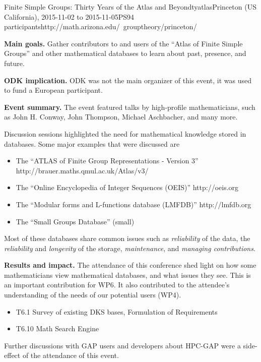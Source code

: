 \begin{event}{Finite Simple Groups: Thirty Years of the Atlas and
    Beyond}{tyatlas}{Princeton (US California), 2015-11-02 to 2015-11-05}{PS}{94
    participants}{http://math.arizona.edu/~grouptheory/princeton/}

\textbf{Main goals.} Gather contributors to and users of the ``Atlas of Finite
Simple Groups'' and other mathematical databases to learn about past, presence,
and future.

\textbf{ODK implication.} ODK was not the main organizer of this event, it was used to fund
a European participant.

\textbf{Event summary.} The event featured talks by high-profile mathematicians,
such as John H. Conway, John Thompson, Michael Aschbacher, and many more.

Discussion sessions highlighted the need for mathematical knowledge
stored in databases. Some major examples that were discussed are
\begin{itemize}
  \item The ``ATLAS of Finite Group Representations - Version 3''
    http://brauer.maths.qmul.ac.uk/Atlas/v3/
  \item The ``Online Encyclopedia of Integer Sequences (OEIS)''
    http://oeis.org
  \item The ``Modular forms and L-functions database (LMFDB)''
    http://lmfdb.org
  \item The ``Small Groups Database'' (small)
\end{itemize}

Most of these databases share common issues such as \emph{reliability} of the
data, the \emph{reliability} and \emph{longevity} of the storage,
\emph{maintenance}, and \emph{managing contributions}.
    
\textbf{Results and impact.} 
The attendance of this conference shed light on how some mathematicians view
mathematical databases, and what issues they see. This is an important
contribution for WP6. It also contributed to the attendee's understanding of the
needs of our potential users (WP4).

\begin{itemize}
\item T6.1 Survey of existing DKS bases, Formulation of Requirements
\item T6.10 Math Search Engine

\end{itemize}

Further discussions with GAP users and developers about HPC-GAP were a
side-effect of the attendance of this event. 

\end{event}